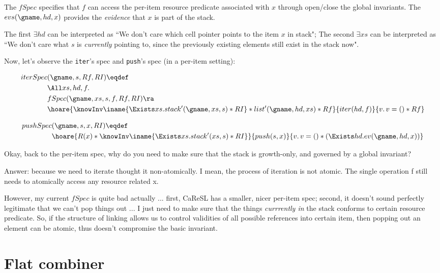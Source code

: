 \documentclass[11pt]{article}
\begin{document}
The $fSpec$ specifies that $f$ can access the per-item resource predicate associated with $x$ through open/close the global invariants. The $evs(\gname, hd, x)$ provides the \emph{evidence} that $x$ is part of the stack.

The first $\exists hd$ can be interpreted as ``We don't care which cell pointer points to the item $x$ in stack"; The second $\exists xs$ can be interpreted as ``We don't care what $s$ is \emph{currently} pointing to, since the previously existing elements still exist in the stack now".

Now, let's observe the \texttt{iter}'s spec and \texttt{push}'s spec (in a per-item setting):

\begin{align*}
  iterSpec&(\gname, s, Rf, RI) \eqdef\\
    &\All xs, hd, f.\\
         &fSpec(\gname, xs, s, f, Rf, RI) \ra\\
         &\hoare{\knowInv\iname{\Exists xs. stack'(\gname, xs, s) * RI} * list'(\gname, hd, xs) * Rf}{iter(hd, f)}{ v.\, v = () * Rf}
\end{align*}

\begin{align*}
  pushSpec&(\gname, s, x, RI) \eqdef\\
  &\hoare{R(x) * \knowInv\iname{\Exists xs. stack'(xs, s) * RI}}{push(s, x)}{v.\, v = () * (\Exists hd. ev(\gname, hd, x))}
\end{align*}

Okay, back to the per-item spec, why do you need to make sure that the stack is growth-only, and governed by a global invariant?

Answer: because we need to iterate thought it non-atomically. I mean, the process of iteration is not atomic. The single operation f still needs to atomically access any resource related x.

However, my current $fSpec$ is quite bad actually ... first, CaReSL has a smaller, nicer per-item spec; second, it doesn't sound perfectly legitimate that we can't pop things out ... I just need to make sure that the things \emph{currrently in} the stack conforms to certain resource predicate. So, if the structure of linking allows us to control validities of all possible references into certain item, then popping out an element can be atomic, thus doesn't compromise the basic invariant.

\section{Flat combiner}
\end{document}
